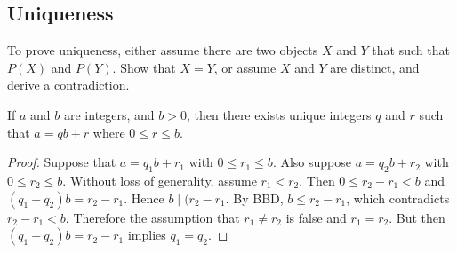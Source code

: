 \documentclass[english, 12pt]{article}
\begin{document}
\subsection{Uniqueness}
To prove uniqueness, either assume there are two objects $X$ and $Y$ that such that $P(X)$ and $P(Y)$. Show that $X=Y$, or assume $X$ and $Y$ are distinct, and derive a contradiction.
\begin{thrm}
If $a$ and $b$ are integers, and $b > 0$, then there exists unique integers $q$ and $r$ such that $a = qb + r$ where $0 \leq r \leq b$.
\begin{proof}
Suppose that $a=q_{1}b + r_{1}$ with $ 0 \leq r_{1} \leq b$. Also suppose $a=q_{2}b + r_{2}$ with $ 0 \leq r_{2} \leq b$. Without loss of generality, assume $r_{1} < r_{2}$. Then $0 \leq r_{2} - r_{1} < b$ and $(q_{1}-q_{2})b = r_{2} - r_{1}$. Hence $b \mid (r_{2} - r_{1}$. By BBD, $b \leq r_{2} - r_{1}$, which contradicts $r_{2} - r_{1} < b$. Therefore the assumption that $r_{1} \neq r_{2}$ is false and $r_{1} = r_{2}$. But then $(q_{1} - q_{2})b = r_{2} - r_{1}$ implies $q_{1} = q_{2}$.
\end{proof}
\end{thrm}
\end{document}
